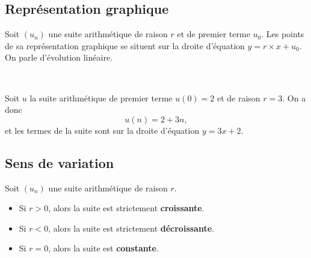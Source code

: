 \documentclass[11pt]{article}
\begin{document}
\subsection{Représentation graphique}
\begin{prop}
  Soit $\left( u_n \right)$ une suite arithmétique de raison $r$ et de premier
  terme $u_0$. Les points de sa représentation graphique se situent sur la
  droite d'équation $y=r\times x+u_0$. On parle d'évolution linéaire.
\end{prop}

\begin{exemple}~\\[-5mm]
  \begin{minipage}[]{.5\textwidth}
    Soit $u$ la suite arithmétique de premier terme $u(0)=2$ et de raison $r=3$.
    On a donc
    \[
      u(n) = 2+3n,
    \]
    et les termes de la suite sont sur la droite d'équation $y = 3x+2$.
  \end{minipage}
  \begin{minipage}[]{.5\textwidth}
      \begin{center}
  \end{center}
  \end{minipage}
\end{exemple}

\subsection{Sens de variation}
\begin{prop}
  Soit $\left( u_n \right)$ une suite arithmétique de raison $r$.
  \begin{itemize}
    \item Si $r>0$, alors la suite est strictement \textbf{croissante}.
    \item Si $r<0$, alors la suite est strictement \textbf{décroissante}.
    \item Si $r=0$, alors la suite est \textbf{constante}.
  \end{itemize}
\end{prop}
\end{document}
